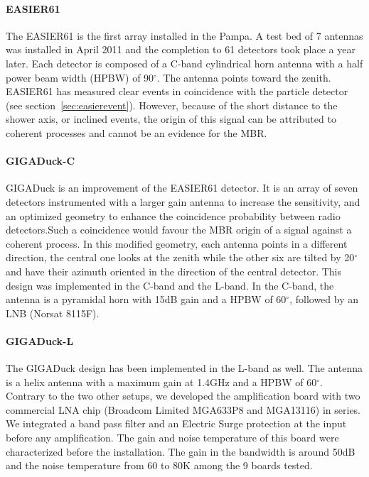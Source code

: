 \documentclass{PoS}
\begin{document}
\paragraph{EASIER61}
The EASIER61 is the first array installed in the Pampa. A test bed of 7 antennas was installed in April 2011 and the completion to 61 detectors took place a year later. Each detector is composed of a C-band cylindrical horn antenna with a half power beam width (HPBW) of 90$^\circ$. The antenna points toward the zenith. EASIER61 has measured clear events in coincidence with the particle detector (see section~\ref{sec:easierevent}). However, because of the short distance to the shower axis, or  inclined events, the origin of this signal can be attributed to coherent processes and cannot be an evidence for the MBR.
\paragraph{GIGADuck-C}
GIGADuck is an improvement of the EASIER61 detector. It is an array of seven detectors instrumented with a larger gain antenna to increase the sensitivity, and an optimized geometry to enhance the coincidence probability between radio detectors.Such a coincidence  would favour the MBR origin of a signal against a coherent process. In this modified geometry, each antenna points in a different direction, the central one looks at the zenith while the other six are tilted by 20$^\circ$ and have their azimuth oriented in the direction of the central detector. This design was implemented in the C-band and the L-band. In the C-band, the antenna is a pyramidal horn with 15dB gain and a HPBW of 60$^\circ$, followed by an LNB (Norsat 8115F).
\paragraph{GIGADuck-L}
The GIGADuck design has been implemented in the L-band as well. The antenna is a helix antenna with a maximum gain at 1.4GHz and a HPBW of 60$^\circ$. Contrary to the two other setups, we developed the amplification board with two commercial LNA chip (Broadcom Limited MGA633P8 and MGA13116) in series. We integrated a band pass filter and an Electric Surge protection at the input before any amplification. The gain and noise temperature of this board were characterized before the installation. The gain in the bandwidth is around 50dB and the noise temperature from 60 to 80K among the 9 boards tested.
\end{document}
